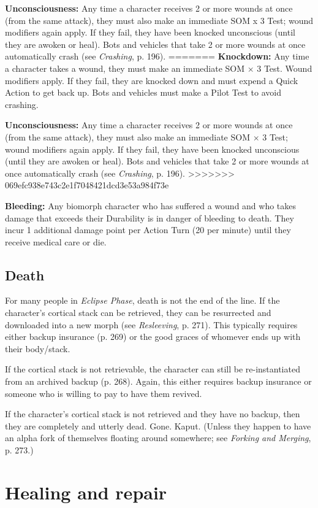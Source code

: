 \textbf{Unconsciousness:} Any time a character receives 2 or more wounds at once (from the same attack), they must also make an immediate SOM x 3 Test; wound modifiers again apply. If they fail, they have been knocked unconscious (until they are awoken or heal). Bots and vehicles that take 2 or more wounds at once automatically crash (see \emph{Crashing}, p. 196).
=======
\textbf{Knockdown:} Any time a character takes a wound, they must make an immediate SOM $\times$ 3 Test. Wound modifiers apply. If they fail, they are knocked down and must expend a Quick Action to get back up. Bots and vehicles must make a Pilot Test to avoid crashing.

\textbf{Unconsciousness:} Any time a character receives 2 or more wounds at once (from the same attack), they must also make an immediate SOM $\times$ 3 Test; wound modifiers again apply. If they fail, they have been knocked unconscious (until they are awoken or heal). Bots and vehicles that take 2 or more wounds at once automatically crash (see \emph{Crashing}, p. 196).
>>>>>>> 069efc938e743c2e1f7048421dcd3e53a984f73e

\textbf{Bleeding:} Any biomorph character who has suffered a wound and who takes damage that exceeds their Durability is in danger of bleeding to death. They incur 1 additional damage point per Action Turn (20 per minute) until they receive medical care or die.

\subsection{Death} For many people in \emph{Eclipse Phase}, death is not the end of the line. If the character’s cortical stack can be retrieved, they can be resurrected and downloaded into a new morph (see \emph{Resleeving}, p. 271). This typically requires either backup insurance (p. 269) or the good graces of whomever ends up with their body/stack.

If the cortical stack is not retrievable, the character can still be re-instantiated from an archived backup (p. 268). Again, this either requires backup insurance or someone who is willing to pay to have them revived.

If the character’s cortical stack is not retrieved and they have no backup, then they are completely and utterly dead. Gone. Kaput. (Unless they happen to have an alpha fork of themselves floating around somewhere; see \emph{Forking and Merging}, p. 273.)


\section{Healing and repair}
\label{sec:healing-repair}

